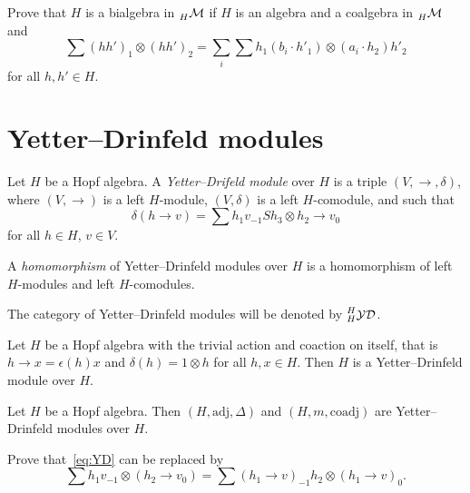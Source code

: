 \documentclass[12pt]{amsproc}
\newcommand{\ydH}{\prescript{H}{H}{\mathcal{YD}}}
\newcommand{\lmod}[1]{\prescript{}{#1}{\mathcal{M}}}
\begin{document}
\begin{exercise}
    Prove that $H$ is a bialgebra in $\lmod{H}$ if $H$ is an algebra
and a coalgebra in $\lmod{H}$ and 
\[
\sum (hh')_{1}\otimes(hh')_{2}=\sum_{i}\sum h_{1}(b_{i}\cdot h'_{1})\otimes(a_{i}\cdot h_{2})h'_{2}
\]
for all $h,h'\in H$.
\end{exercise}

\section{Yetter--Drinfeld modules}

\begin{definition}
Let $H$ be a Hopf algebra. A \emph{Yetter--Drifeld module} over $H$ is a
triple $(V,\rightarrow,\delta)$, where $(V,\rightarrow)$ is a left $H$-module,
$(V,\delta)$ is a left $H$-comodule, and such that 
\begin{equation}
\delta(h\rightarrow v)=\sum h_{1}v_{-1}Sh_{3}\otimes h_{2}\rightarrow v_{0}\label{eq:YD}
\end{equation}
for all $h\in H$, $v\in V$. 
\end{definition}

\begin{definition}
A \emph{homomorphism} of Yetter--Drinfeld modules over $H$ 
is a homomorphism of left $H$-modules and left $H$-comodules. 
\end{definition}

The category of Yetter--Drinfeld
modules will be denoted by $\ydH$.

\begin{example}
Let $H$ be a Hopf algebra with the trivial action and coaction on itself, that is 
$h\rightarrow x=\epsilon(h)x$ and $\delta(h)=1\otimes h$ for all $h,x\in H$.
Then $H$ is a Yetter--Drinfeld module over $H$.
\end{example}

\begin{example}
Let $H$ be a Hopf algebra. Then $(H,\mathrm{adj},\Delta)$ and
$(H,m,\mathrm{coadj})$ are Yetter--Drinfeld modules over $H$.
\end{example}

\begin{exercise}
\label{xca:YD_condition}
Prove that~\eqref{eq:YD} can be replaced by 
\begin{equation}
\label{eq:left_left_YD_equivalent}
\sum h_{1}v_{-1}\otimes(h_{2}\rightarrow v_{0})
=\sum (h_{1}\rightarrow v)_{-1}h_{2}\otimes(h_{1}\rightarrow v)_{0}.
\end{equation}
\end{exercise}
\end{document}
